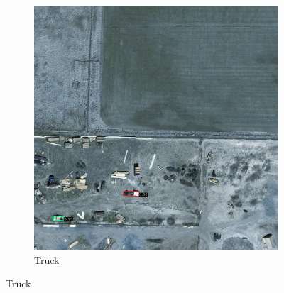 \begin{figure}[h!]
\begin{subfigure}[t]{0.38\textwidth}
        \includegraphics[width=\linewidth]{images/015Results/02perm_exp/comp_images/rgbndvi/212.png}
        \caption{Truck}
    \end{subfigure}
    

\end{figure}
